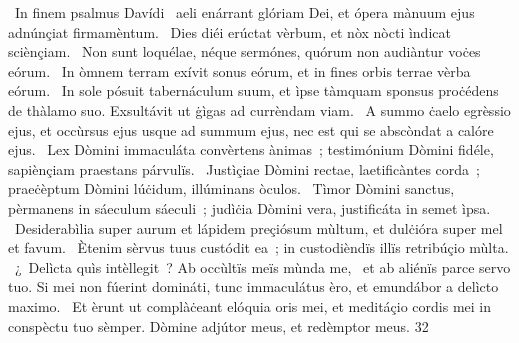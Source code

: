 {~In finem psalmus Davídi}
{%
~aeli enárrant glóriam Dei, et ópera mànuum ejus adnúnçiat firmamèntum.
~Dies diéi erúctat vèrbum, et nòx nòcti ìndicat sciènçiam.
~Non sunt loquélae, néque sermónes, quórum non audiàntur voċes eórum.
~In òmnem terram exívit sonus eórum, et in fines orbis terrae vèrba eórum.
~In sole pósuit tabernáculum suum, et ìpse tàmquam sponsus proċédens de thàlamo suo. Exsultávit ut ġìgas ad currèndam viam.
~A summo ċaelo egrèssio ejus, et occùrsus ejus usque ad summum ejus, nec est qui se abscòndat a calóre ejus.
~Lex Dòmini immaculáta convèrtens ànimas~; testimónium Dòmini fidéle, sapiènçiam praestans párvulïs.
~Justìçiae Dòmini rectae, laetificàntes corda~; praeċèptum Dòmini lúċidum, illúminans òculos.
~Tìmor Dòmini sanctus, pèrmanens in sáeculum sáeculi~; judìċia Dòmini vera, justificáta in semet ìpsa.
~Desiderabìlia super aurum et lápidem preçiósum mùltum, et dulċióra super mel et favum.
~Ètenim sèrvus tuus custódit ea~; in custodièndïs illïs retribúçio mùlta.
~¿~Delìcta quìs intèllegit~? Ab occùltïs meïs mùnda me,
~et ab aliénïs parce servo tuo. Si mei non fúerint domináti, tunc immaculátus èro, et emundábor a delìcto maximo.
~Et èrunt ut complàċeant elóquia oris mei, et meditáçio cordis mei in conspèctu tuo sèmper. Dòmine adjútor meus, et redèmptor meus.}
{3}{2}
